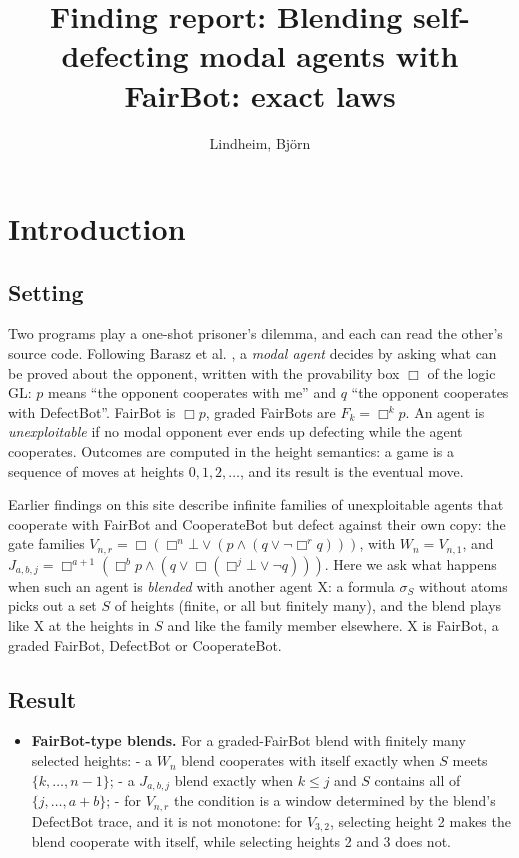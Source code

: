\documentclass{article}
\title{Finding report: Blending self-defecting modal agents with FairBot: exact laws}
\author{Lindheim, Björn}
\date{}
\begin{document}
\maketitle
\section{Introduction}
\label{sec:blend-window-laws}

\subsection*{Setting}

Two programs play a one-shot prisoner's dilemma, and each can read the other's source code.
Following Barasz et al. \cite{barasz2014robust}, a \emph{modal agent} decides by asking what can be proved
about the opponent, written with the provability box $\Box$ of the logic GL: $p$ means ``the
opponent cooperates with me'' and $q$ ``the opponent cooperates with DefectBot''. FairBot is
$\Box p$, graded FairBots are $F_k = \Box^k p$. An agent is \emph{unexploitable} if no modal opponent
ever ends up defecting while the agent cooperates. Outcomes are computed in the height semantics:
a game is a sequence of moves at heights $0, 1, 2, \dots$, and its result is the eventual move.

Earlier findings on this site describe infinite families of unexploitable agents that cooperate
with FairBot and CooperateBot but defect against their own copy: the gate families
$V_{n,r} = \Box(\Box^n\bot \vee (p \wedge (q \vee \neg\Box^r q)))$, with $W_n = V_{n,1}$, and
$J_{a,b,j} = \Box^{a+1}(\Box^b p \wedge (q \vee \Box(\Box^j\bot \vee \neg q)))$. Here we ask what
happens when such an agent is \emph{blended} with another agent X: a formula $\sigma_S$ without atoms
picks out a set $S$ of heights (finite, or all but finitely many), and the blend plays like X at
the heights in $S$ and like the family member elsewhere. X is FairBot, a graded FairBot,
DefectBot or CooperateBot.

\subsection*{Result}

\begin{itemize}
\item \textbf{FairBot-type blends.} For a graded-FairBot blend with finitely many selected heights: - a $W_n$ blend cooperates with itself exactly when $S$ meets $\{k, \dots, n-1\}$; - a $J_{a,b,j}$ blend exactly when $k \le j$ and $S$ contains all of $\{j, \dots, a+b\}$; - for $V_{n,r}$ the condition is a window determined by the blend's DefectBot trace, and it is not monotone: for $V_{3,2}$, selecting height 2 makes the blend cooperate with itself, while selecting heights 2 and 3 does not.
\end{itemize}
\end{document}
